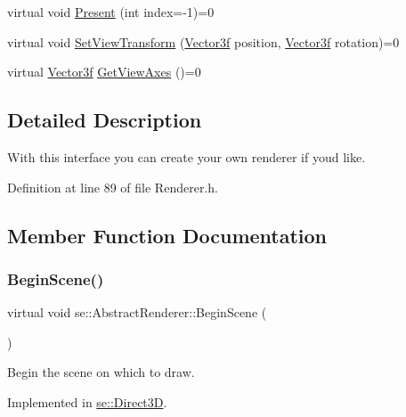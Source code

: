 \begin{DoxyCompactItemize}
\item 
virtual void \mbox{\hyperlink{classse_1_1_abstract_renderer_a5102e4df9100f6c0df9c26beaca6c4e4}{Present}} (int index=-\/1)=0
\item 
virtual void \mbox{\hyperlink{classse_1_1_abstract_renderer_a710e67232e977fbb3b74f79640e0b62e}{Set\+View\+Transform}} (\mbox{\hyperlink{namespacese_a12e07512d95e2fdebdaf74a5ea2cf5f6}{Vector3f}} position, \mbox{\hyperlink{namespacese_a12e07512d95e2fdebdaf74a5ea2cf5f6}{Vector3f}} rotation)=0
\item 
virtual \mbox{\hyperlink{namespacese_a12e07512d95e2fdebdaf74a5ea2cf5f6}{Vector3f}} \mbox{\hyperlink{classse_1_1_abstract_renderer_a8af4c1bef5cf120f6160f5d93dd74207}{Get\+View\+Axes}} ()=0
\end{DoxyCompactItemize}


\subsection{Detailed Description}
With this interface you can create your own renderer if you\textquotesingle{}d like. 

Definition at line 89 of file Renderer.\+h.



\subsection{Member Function Documentation}
\mbox{\label{classse_1_1_abstract_renderer_aae5f9f2f51f290846e4ffd9e2a3d2a8e}} 
\subsubsection{\texorpdfstring{Begin\+Scene()}{BeginScene()}}
{\footnotesize\ttfamily virtual void se\+::\+Abstract\+Renderer\+::\+Begin\+Scene (\begin{DoxyParamCaption}{ }\end{DoxyParamCaption})\hspace{0.3cm}{\ttfamily [pure virtual]}}

Begin the scene on which to draw. 

Implemented in \mbox{\hyperlink{classse_1_1_direct3_d_a0509351979bce1ab27d7cbd6cdc4b5de}{se\+::\+Direct3D}}.

